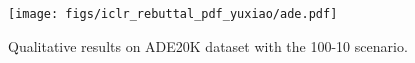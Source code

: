 \begin{figure}[H]
    \centering
    \texttt{[image: figs/iclr\_rebuttal\_pdf\_yuxiao/ade.pdf]}
    \caption{Qualitative results on ADE20K dataset with the 100-10 scenario.}
    \label{fig:vis_ade}
\end{figure}





